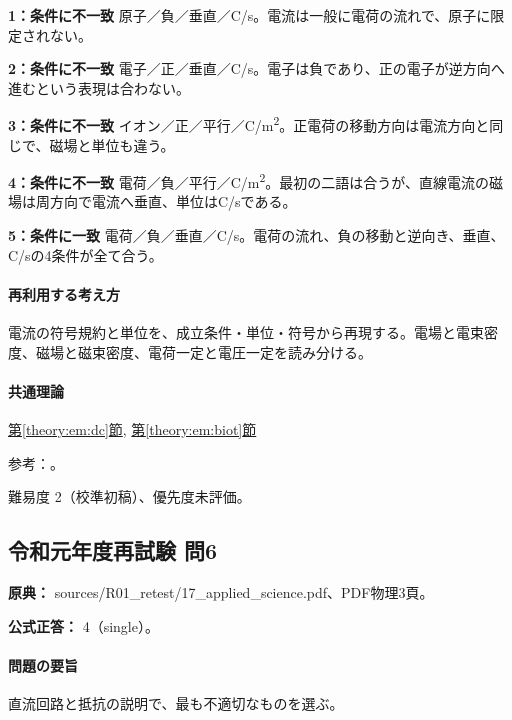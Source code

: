 \noindent\textbf{1：条件に不一致} 原子／負／垂直／C/s。電流は一般に電荷の流れで、原子に限定されない。\par

\noindent\textbf{2：条件に不一致} 電子／正／垂直／C/s。電子は負であり、正の電子が逆方向へ進むという表現は合わない。\par

\noindent\textbf{3：条件に不一致} イオン／正／平行／C/m\textsuperscript{2}。正電荷の移動方向は電流方向と同じで、磁場と単位も違う。\par

\noindent\textbf{4：条件に不一致} 電荷／負／平行／C/m\textsuperscript{2}。最初の二語は合うが、直線電流の磁場は周方向で電流へ垂直、単位はC/sである。\par

\noindent\textbf{5：条件に一致} 電荷／負／垂直／C/s。電荷の流れ、負の移動と逆向き、垂直、C/sの4条件が全て合う。\par

\paragraph{再利用する考え方} 電流の符号規約と単位を、成立条件・単位・符号から再現する。電場と電束密度、磁場と磁束密度、電荷一定と電圧一定を読み分ける。

\paragraph{共通理論} \hyperref[theory:em:dc]{第\ref*{theory:em:dc}節}, \hyperref[theory:em:biot]{第\ref*{theory:em:biot}節}

\par 参考：\cite{mit_em06,mit_em09}。

\par 難易度 2（校準初稿）、優先度未評価。

\subsection{令和元年度再試験 問6}
\label{q:r01-ret-applied-06}

\noindent\textbf{原典：} sources/R01\_retest/17\_applied\_science.pdf、PDF物理3頁。

\textbf{公式正答：} 4（single）。

\paragraph{問題の要旨} 直流回路と抵抗の説明で、最も不適切なものを選ぶ。

